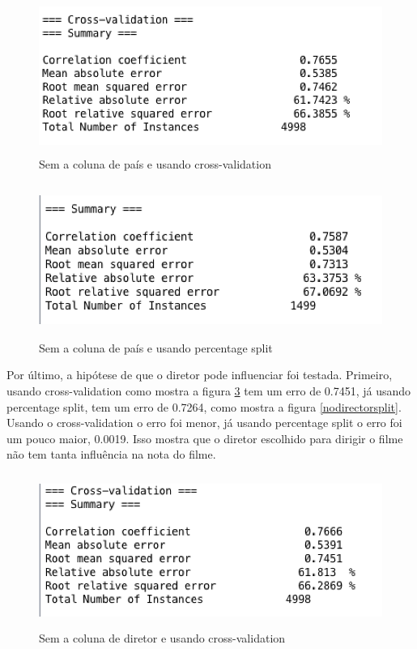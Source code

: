 \begin{figure}[H]
\centering
\includegraphics[height=5cm]{imagens/no_country_cv.png}
\caption{Sem a coluna de país e usando cross-validation}
\label{nocountrycv}
\end{figure}

\begin{figure}[H]
\centering
\includegraphics[height=5cm]{imagens/no_country_split.png}
\caption{Sem a coluna de país e usando percentage split}
\label{nocountrysplit}
\end{figure}


Por último, a hipótese de que o diretor pode influenciar foi testada. Primeiro, usando cross-validation como mostra a figura \ref{nodirectorcv} tem um erro de 0.7451, já usando percentage split, tem um erro de 0.7264, como mostra a figura \ref{nodirectorsplit}. Usando o cross-validation o erro foi menor, já usando percentage split o erro foi um pouco maior, 0.0019. Isso mostra que o diretor escolhido para dirigir o filme não tem tanta influência na nota do filme. 

\begin{figure}[H]
\centering
\includegraphics[height=5cm]{imagens/no_director_cv.png}
\caption{Sem a coluna de diretor e usando cross-validation}
\label{nodirectorcv}
\end{figure}


